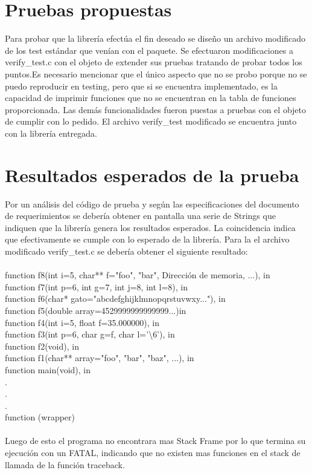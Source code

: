 \documentclass[twocolumn,11pts]{IEEEtran}
\begin{document}
\section{Pruebas propuestas}
Para probar que la librería efectúa el fin deseado se diseño un archivo modificado de los test estándar que venían con el paquete. Se efectuaron modificaciones a verify\_test.c con el objeto de extender sus pruebas tratando de probar todos los puntos.Es necesario mencionar que el único aspecto que no se probo porque no se puedo reproducir en testing, pero que si se encuentra implementado, es la capacidad de imprimir funciones que no se encuentran en la tabla de funciones proporcionada. Las demás funcionalidades fueron puestas a pruebas con el objeto de cumplir con lo pedido. El archivo verify\_test modificado se encuentra junto con la librería entregada.
\section{Resultados esperados de la prueba}
Por un análisis del código de prueba y según las especificaciones del documento de requerimientos se debería obtener en pantalla una serie de Strings que indiquen que la librería genera los resultados esperados. La coincidencia indica que efectivamente se cumple con lo esperado de la librería. Para la el archivo modificado verify\_test.c se debería obtener el siguiente resultado:
\\
\\
function f8(int i=5, char** f={"foo", "bar", Dirección de memoria, ...}), in\\
function f7(int p=6, int g=7, int j=8, int l=8), in\\
function f6(char* gato="abcdefghijklmnopqrstuvwxy..."), in\\
function f5(double array=4529999999999999...)in\\
function f4(int i=5, float f=35.000000), in\\
function f3(int p=6, char g=f, char l='\textbackslash6'), in\\
function f2(void), in\\
function f1(char** array={"foo", "bar", "baz", ...}), in\\
function main(void), in\\
.\\
.\\
.\\
function (wrapper)
\\\\
Luego de esto el programa no encontrara mas Stack Frame por lo que termina su ejecución con un FATAL, indicando que no existen mas funciones en el stack de llamada de la función traceback.
\end{document}
